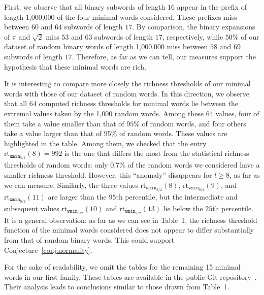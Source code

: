 \documentclass{template_arxiv}
\numberwithin{equation}{section}
\newcommand{\rt}{\mathrm{rt}}
\newcommand{\wmin}{\mathtt{wmin}}
\begin{document}
First, we observe that all binary subwords of length $16$ appear in the prefix of length 1,000,000 of the four minimal words considered. These prefixes miss between $60$ and $64$ subwords of length $17$. By comparison, the binary expansions of $\pi$ and $\sqrt{2}$ miss $53$ and $63$ subwords of length $17$, respectively, while $50\%$ of our dataset of random binary words of length 1,000,000 miss between $58$ and $69$ subwords of length $17$. Therefore, as far as we can tell, our measures support the hypothesis that these minimal words are rich.

It is interesting to compare more closely the richness thresholds of our minimal words with those of our dataset of random words. In this direction, we observe that all 64 computed richness thresholds for minimal words lie between the extremal values taken by the 1,000 random words. Among these 64 values, four of them take a value smaller than that of $95\%$ of random words, and four others take a value larger than that of $95\%$ of random words. These values are highlighted in the table.  Among them, we checked that the entry $\rt_{\wmin_{5/2}}(8)=992$ is the one that differs the most from the statistical richness thresholds of random words: only $0.7\%$ of the random words we considered have a smaller richness threshold. However, this ``anomaly'' disappears for $l \geq 8$, as far as we can measure. %
 Similarly, the three values $\rt_{\wmin_{9/2}}(8)$, $\rt_{\wmin_{9/2}}(9)$, and $\rt_{\wmin_{9/2}}(11)$ are larger than the $95$th percentile, but the intermediate and subsequent values $\rt_{\wmin_{9/2}}(10)$ and $\rt_{\wmin_{9/2}}(13)$ lie below the $25$th percentile.
It is a general observation: as far as we can see in Table~1, the richness threshold function of the minimal words considered does not appear to differ substantially from that of random binary words. This could support Conjecture~\ref{conj:normality}.

\bigskip

For the sake of readability, we omit the tables for the remaining 15 minimal words in our first family. These tables are available in the public Git repository~\cite{Git26}. Their analysis leads to conclusions similar to those drawn from Table~1.


\end{document}
